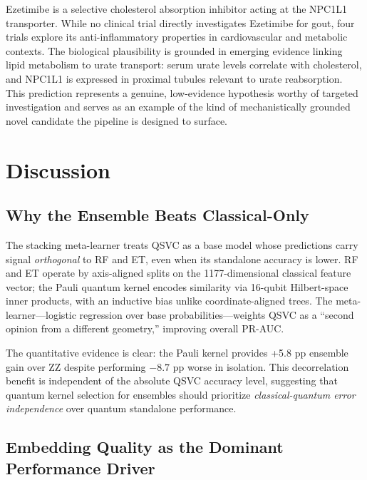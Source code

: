 \documentclass[twocolumn,10pt]{article}
\begin{document}
Ezetimibe is a selective cholesterol absorption inhibitor acting at the NPC1L1 transporter. While no clinical trial directly investigates Ezetimibe for gout, four trials explore its anti-inflammatory properties in cardiovascular and metabolic contexts. The biological plausibility is grounded in emerging evidence linking lipid metabolism to urate transport: serum urate levels correlate with cholesterol, and NPC1L1 is expressed in proximal tubules relevant to urate reabsorption. This prediction represents a genuine, low-evidence hypothesis worthy of targeted investigation and serves as an example of the kind of mechanistically grounded novel candidate the pipeline is designed to surface.

\section{Discussion}

\subsection{Why the Ensemble Beats Classical-Only}

The stacking meta-learner treats QSVC as a base model whose predictions carry signal \textit{orthogonal} to RF and ET, even when its standalone accuracy is lower. RF and ET operate by axis-aligned splits on the 1177-dimensional classical feature vector; the Pauli quantum kernel encodes similarity via 16-qubit Hilbert-space inner products, with an inductive bias unlike coordinate-aligned trees. The meta-learner---logistic regression over base probabilities---weights QSVC as a ``second opinion from a different geometry,'' improving overall PR-AUC.

The quantitative evidence is clear: the Pauli kernel provides +5.8 pp ensemble gain over ZZ despite performing $-8.7$ pp worse in isolation. This decorrelation benefit is independent of the absolute QSVC accuracy level, suggesting that quantum kernel selection for ensembles should prioritize \textit{classical-quantum error independence} over quantum standalone performance.

\subsection{Embedding Quality as the Dominant Performance Driver}
\end{document}
